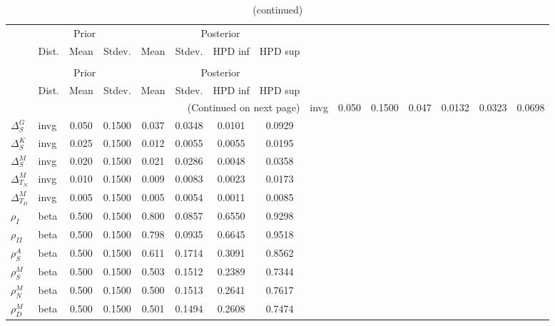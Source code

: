  
\begin{center}
\begin{longtable}{llcccccc} 
\caption{Results from Metropolis-Hastings (parameters)}
 \label{Table:MHPosterior:1}\\
\toprule 
  & \multicolumn{3}{c}{Prior}  &  \multicolumn{4}{c}{Posterior} \\
  \cmidrule(r{.75em}){2-4} \cmidrule(r{.75em}){5-8}
  & Dist. & Mean  & Stdev. & Mean & Stdev. & HPD inf & HPD sup\\
\midrule \endfirsthead 
\caption{(continued)}\\\toprule 
  & \multicolumn{3}{c}{Prior}  &  \multicolumn{4}{c}{Posterior} \\
  \cmidrule(r{.75em}){2-4} \cmidrule(r{.75em}){5-8}
  & Dist. & Mean  & Stdev. & Mean & Stdev. & HPD inf & HPD sup\\
\midrule \endhead 
\bottomrule \multicolumn{8}{r}{(Continued on next page)} \endfoot 
\bottomrule \endlastfoot 
${\Delta^{A}_{S}}$ & invg &   0.050 & 0.1500 &   0.047& 0.0132 &  0.0323 &  0.0698 \\ 
${\Delta^{G}_{S}}$ & invg &   0.050 & 0.1500 &   0.037& 0.0348 &  0.0101 &  0.0929 \\ 
${\Delta^{K}_{S}}$ & invg &   0.025 & 0.1500 &   0.012& 0.0055 &  0.0055 &  0.0195 \\ 
${\Delta^{M}_{S}}$ & invg &   0.020 & 0.1500 &   0.021& 0.0286 &  0.0048 &  0.0358 \\ 
${\Delta^{M}_{T_N}}$ & invg &   0.010 & 0.1500 &   0.009& 0.0083 &  0.0023 &  0.0173 \\ 
${\Delta^{M}_{T_D}}$ & invg &   0.005 & 0.1500 &   0.005& 0.0054 &  0.0011 &  0.0085 \\ 
${\rho_{I}}$ & beta &   0.500 & 0.1500 &   0.800& 0.0857 &  0.6550 &  0.9298 \\ 
${\rho_{II}}$ & beta &   0.500 & 0.1500 &   0.798& 0.0935 &  0.6645 &  0.9518 \\ 
${\rho^{A}_{S}}$ & beta &   0.500 & 0.1500 &   0.611& 0.1714 &  0.3091 &  0.8562 \\ 
${\rho^{M}_{S}}$ & beta &   0.500 & 0.1500 &   0.503& 0.1512 &  0.2389 &  0.7344 \\ 
${\rho^{M}_{N}}$ & beta &   0.500 & 0.1500 &   0.500& 0.1513 &  0.2641 &  0.7617 \\ 
${\rho^{M}_{D}}$ & beta &   0.500 & 0.1500 &   0.501& 0.1494 &  0.2608 &  0.7474 \\ 
\end{longtable}
 \end{center}
